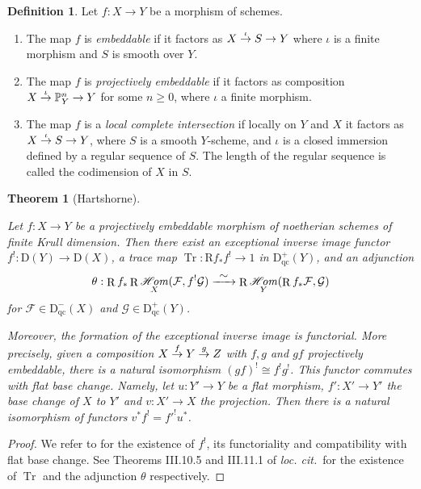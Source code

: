 \documentclass[10pt,a4paper]{amsart}
\newcommand\To[1]{\mathchoice{\xrightarrow{\textstyle\kern4pt#1\kern3pt}}{\stackrel{#1}{\to}}{}{}}
\newcommand{\qc}{\mathrm{qc}}
\numberwithin{equation}{section}
\newtheorem{theo}[prop]{Theorem}
\theoremstyle{definition}
\newtheorem{definition}[prop]{Definition}
\newcommand{\bb}[1]{\mathbb{#1}}
\newcommand{\n}[1]{\mathcal{#1}}
\newcommand{\s}[1]{\mathscr{#1}}
\DeclareMathOperator{\Tr}{Tr}
\DeclareMathOperator{\R}{R}
\DeclareMathOperator{\sHom}{\s{H}\!\mathit{om}}
\providecommand{\loccit}{\emph{loc. cit.}}
\begin{document}
\begin{definition}
Let $f:X\to Y$ be a morphism of schemes.
\begin{enumerate}
\item The map $f$ is \textit{embeddable} if it factors as $X\To{\iota} S \to Y $ where $\iota$ is a finite morphism and $S$ is smooth over $Y$.
\item The map $f$ is \textit{projectively embeddable} if it factors as composition \hbox{$ X\To{\iota} \bb{P}^n_Y\to Y$} for some $n\geq 0$, where $\iota$ a finite morphism.

\item The map $f$ is a \textit{local complete intersection} if locally on $Y$ and $X$ it factors as $X\To{\iota} S \to Y $, where $S$ is a smooth $Y$-scheme, and $\iota$ is a closed immersion defined by a regular sequence of $S$. The length of the regular sequence is called the codimension of $X$ in $S$.
\end{enumerate}
\end{definition}

\begin{theo}[Hartshorne]
\label{GrothSerreDuality}

Let $f: X\to Y$ be a projectively embeddable morphism of noetherian schemes of finite Krull dimension. Then there exist an exceptional inverse image functor $f^!: \mathrm{D}(Y)\to \mathrm{D}(X)$, a trace map $\Tr: \mathrm{R}f_*f^!\to 1$ in $\mathrm{D}^+_{\qc}(Y)$, and an adjunction
\[
\theta: \R f_* \R \sHom_{X}(\n{F}, f^! \n{G}) \To{\sim} \R\sHom_Y(\R f_* \n{F}, \n{G})
\]
for $\s{F}\in \mathrm{D}^-_{\qc}(X)$ and $\s{G}\in \mathrm{D}^+_{\qc}(Y)$.

Moreover, the formation of the exceptional inverse image is functorial. More precisely, given a composition $X\To{f} Y \To{g} Z$ with $f,g$ and $gf$ projectively embeddable, there is a natural isomorphism $(gf)^!\cong f^!g^!$. This functor commutes with flat base change. Namely, let $u:Y'\to Y$ be a flat morphism, $f':X'\to Y'$ the base change of $X$ to $Y'$ and $v: X'\to X$ the projection. Then there is a natural isomorphism of functors $v^*f^!={f'}^! u^*$.
\end{theo}

\begin{proof}
We refer to \cite[Th.\,III.8.7]{hartshorne1966residues} for the existence of $f^!$, its functoriality and compatibility with flat base change. See Theorems III.10.5 and III.11.1 of \loccit\ for the existence of $\Tr$ and the adjunction $\theta$ respectively.
\end{proof}
\end{document}

